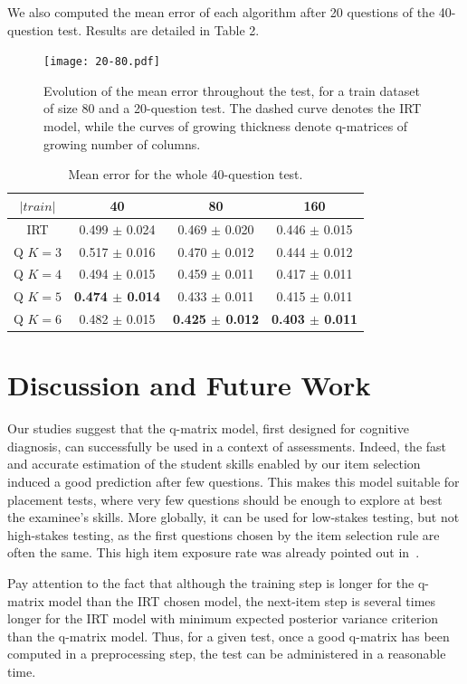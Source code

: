 \documentclass{sig-alternate}
\begin{document}
We also computed the mean error of each algorithm after 20 questions of the 40-question test. Results are detailed in Table 2.

\begin{figure}
\texttt{[image: 20-80.pdf]}
\caption{Evolution of the mean error throughout the test, for a train dataset of size 80 and a 20-question test. The dashed curve denotes the IRT model, while the curves of growing thickness denote q-matrices of growing number of columns.}
\label{fig:1}
\end{figure}

\begin{table}[H]
\small\centering\begin{tabular}{@{}cccc@{}}
$|train|$ & 40 & 80 & 160\\
\hline
IRT & 0.499 $\pm$ 0.024 & 0.469 $\pm$ 0.020 & 0.446 $\pm$ 0.015\\
Q $K = 3$ & 0.517 $\pm$ 0.016 & 0.470 $\pm$ 0.012 & 0.444 $\pm$ 0.012\\
Q $K = 4$ & 0.494 $\pm$ 0.015 & 0.459 $\pm$ 0.011 & 0.417 $\pm$ 0.011\\
Q $K = 5$ & \textbf{0.474 $\pm$ 0.014} & 0.433 $\pm$ 0.011 & 0.415 $\pm$ 0.011\\
Q $K = 6$ & 0.482 $\pm$ 0.015 & \textbf{0.425 $\pm$ 0.012} & \textbf{0.403 $\pm$ 0.011}\\
\end{tabular}
\caption{Mean error for the whole 40-question test.}
\label{tab:40q}
\end{table}

\section{Discussion and Future Work}

Our studies suggest that the q-matrix model, first designed for cognitive diagnosis, can successfully be used in a context of assessments. Indeed, the fast and accurate estimation of the student skills enabled by our item selection induced a good prediction after few questions. This makes this model suitable for placement tests, where very few questions should be enough to explore at best the examinee's skills. More globally, it can be used for low-stakes testing, but not high-stakes testing, as the first questions chosen by the item selection rule are often the same. This high item exposure rate was already pointed out in~\citep{Cheng2009}.

Pay attention to the fact that although the training step is longer for the q-matrix model than the IRT chosen model, the next-item step is several times longer for the IRT model with minimum expected posterior variance criterion than the q-matrix model. Thus, for a given test, once a good q-matrix has been computed in a preprocessing step, the test can be administered in a reasonable time. %
\end{document}
